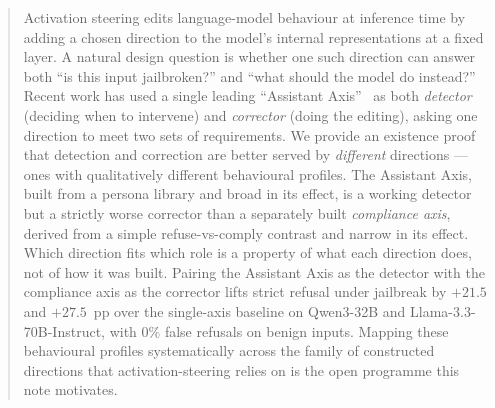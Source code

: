 \documentclass{article}
\begin{document}

\printAffiliationsAndNotice{}

\begin{abstract}
Activation steering edits language-model behaviour at inference
time by adding a chosen direction to the model's internal
representations at a fixed layer. A natural
design question is whether one such direction can answer both
``is this input jailbroken?'' and ``what should the model do
instead?'' Recent work has used a single leading ``Assistant
Axis''~\cite{lu2026assistant} as both \emph{detector} (deciding
when to intervene) and \emph{corrector} (doing the editing),
asking one direction to meet two sets of requirements. We provide an
existence proof that detection and correction are better served by
\emph{different} directions --- ones with qualitatively different
behavioural profiles. The Assistant Axis, built from a persona library
and broad in its effect, is a working detector but a strictly worse
corrector than a separately built \emph{compliance axis}, derived
from a simple refuse-vs-comply contrast and narrow in its effect.
Which direction fits which role is a property of what each direction
does, not of how it was built. Pairing the Assistant Axis as the detector with
the compliance axis as the corrector lifts strict refusal under
jailbreak by $+21.5$ and $+27.5$~pp over the single-axis baseline
on Qwen3-32B and Llama-3.3-70B-Instruct, with $0\%$ false refusals
on benign inputs.
Mapping these behavioural profiles systematically across the family
of constructed directions that activation-steering relies on is the
open programme this note motivates.
\end{abstract}

\end{document}

